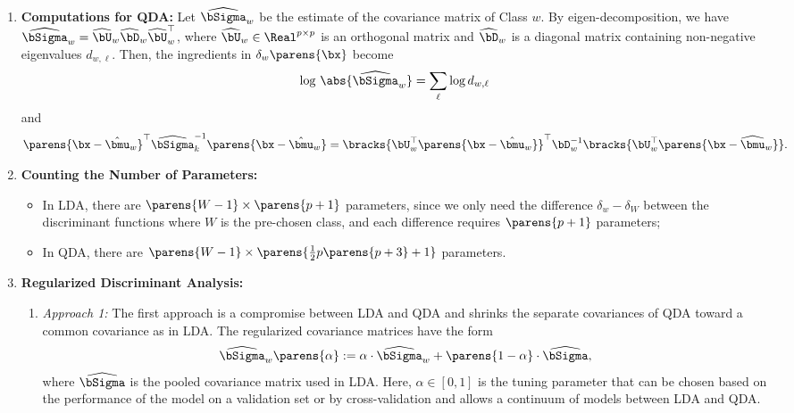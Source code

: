 \documentclass[12pt]{article}
\begin{document}
\begin{enumerate}[label=\textbf{\arabic*.}]
	\item \textbf{Computations for QDA:} Let $\widehat{\bSigma}_w$ be the estimate of the covariance matrix of Class $w$. By eigen-decomposition, we have $\widehat{\bSigma}_w = \widehat{\bU}_w \widehat{\bD}_w \widehat{\bU}_w^\top $, where $\widehat{\bU}_w \in \Real^{p \times p}$ is an orthogonal matrix and $\widehat{\bD}_w$ is a diagonal matrix containing non-negative eigenvalues $d_{w,\ell}$. Then, the ingredients in $\delta_w \parens{\bx}$ become 
	\begin{align*}
		\log \, \abs{ \widehat{\bSigma}_w } = \sum_{\ell} \log d_{w,\ell} 
	\end{align*}
	and 
	\begin{align*}
		\parens{\bx - \hat{\bmu}_w}^\top \widehat{\bSigma}_k^{-1} \parens{\bx - \hat{\bmu}_w} = \bracks{\bU_w^\top \parens{\bx - \hat{\bmu}_w}}^\top \bD_w^{-1} \bracks{ \bU_w^\top \parens{\bx - \widehat{\bmu}_w}}. 
	\end{align*}

	\item \textbf{Counting the Number of Parameters:} 
	\begin{itemize}
		\item In LDA, there are $\parens{W-1} \times \parens{p+1}$ parameters, since we only need the difference $\delta_w - \delta_W$ between the discriminant functions where $W$ is the pre-chosen class, and each difference requires $\parens{p+1}$ parameters; 
		\item In QDA, there are $\parens{W-1} \times \parens{\frac{1}{2} p \parens{p+3} + 1}$ parameters. 
	\end{itemize} 
	
	\item \textbf{Regularized Discriminant Analysis:} 
	\begin{enumerate}

		\item \textit{Approach 1:} The first approach is a compromise between LDA and QDA and shrinks the separate covariances of QDA toward a common covariance as in LDA. The regularized covariance matrices have the form
		\begin{align}\label{eq-reg-lda-qda-1}
			\widehat{\bSigma}_w \parens{\alpha} := \alpha \cdot \widehat{\bSigma}_w + \parens{1-\alpha} \cdot \widehat{\bSigma}, 
		\end{align}
		where $\widehat{\bSigma}$ is the pooled covariance matrix used in LDA. Here, $\alpha \in [0,1]$ is the tuning parameter that can be chosen based on the performance of the model on a validation set or by cross-validation and allows a continuum of models between LDA and QDA. 


\end{enumerate}
\end{enumerate}
\end{document}
